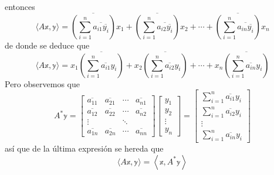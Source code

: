 \begin{theorem}
    entonces
    $$\langle A\mathbb{x}, \mathbb{y} \rangle = \overline{\left( \sum_{i=1}^n \overline{a_{i1} \overline{y_i}} \right)} x_1 + \overline{\left( \sum_{i=1}^n \overline{a_{i2} \overline{y_i}} \right)} x_2 + \cdots + \overline{\left( \sum_{i=1}^n \overline{a_{in} \overline{y_i}} \right)} x_n$$
    de donde se deduce que
    $$\langle A\mathbb{x}, \mathbb{y} \rangle = x_1 \overline{\left( \sum_{i=1}^n \overline{a_{i1}} y_i \right)} + x_2 \overline{\left( \sum_{i=1}^n \overline{a_{i2}} y_i \right)} + \cdots + x_n \overline{\left( \sum_{i=1}^n \overline{a_{in}} y_i \right)}$$
    Pero observemos que
    $$A^* \mathbb{y} = \begin{bmatrix}
        \overline{a_{11}} & \overline{a_{21}} & \cdots & \overline{a_{n1}} \\
        \overline{a_{12}} & \overline{a_{22}} & \cdots & \overline{a_{n2}} \\
        \vdots &  & \ddots & \\
        \overline{a_{1n}} & \overline{a_{2n}} & \cdots & \overline{a_{nn}}
    \end{bmatrix} \begin{bmatrix}
        y_1 \\
        y_2 \\
        \vdots \\
        y_n
    \end{bmatrix} = \begin{bmatrix}
        \displaystyle\sum_{i=1}^n \overline{a_{i1}} y_i \\
        \displaystyle\sum_{i=1}^n \overline{a_{i2}} y_i \\
        \vdots \\
        \displaystyle\sum_{i=1}^n \overline{a_{in}} y_i
    \end{bmatrix}$$
    así que de la última expresión se hereda que
    $$\langle A\mathbb{x}, \mathbb{y} \rangle = \left\langle \mathbb{x}, A^*\mathbb{y} \right\rangle$$
\end{theorem}

